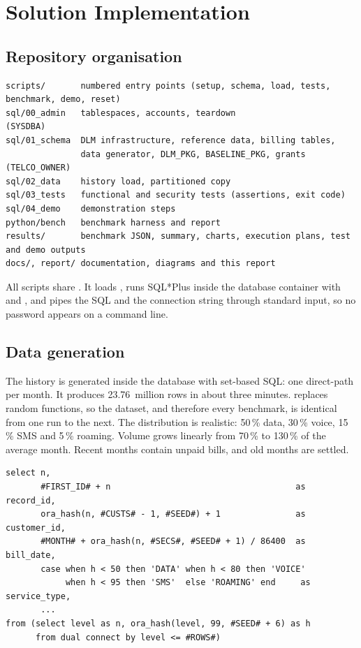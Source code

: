 \chapter{Solution Implementation}\label{ch:implementation}

\section{Repository organisation}

\begin{lstlisting}[style=console]
scripts/       numbered entry points (setup, schema, load, tests, benchmark, demo, reset)
sql/00_admin   tablespaces, accounts, teardown                       (SYSDBA)
sql/01_schema  DLM infrastructure, reference data, billing tables,
               data generator, DLM_PKG, BASELINE_PKG, grants        (TELCO_OWNER)
sql/02_data    history load, partitioned copy
sql/03_tests   functional and security tests (assertions, exit code)
sql/04_demo    demonstration steps
python/bench   benchmark harness and report
results/       benchmark JSON, summary, charts, execution plans, test and demo outputs
docs/, report/ documentation, diagrams and this report
\end{lstlisting}

All scripts share . It loads , runs SQL*Plus inside the
database container with  and , and
pipes the SQL and the connection string through standard input, so no password appears on a
command line.

\section{Data generation}

The history is generated inside the database with set-based SQL: one direct-path
 per month. It produces 23.76~million rows in about three minutes.
 replaces random functions, so the dataset, and therefore
every benchmark, is identical from one run to the next. The distribution is realistic: 50\,\%
data, 30\,\% voice, 15\,\% SMS and 5\,\% roaming. Volume grows linearly from 70\,\% to
130\,\% of the average month. Recent months contain unpaid bills, and old months are settled.

\needspace{0.3\textheight}
\begin{lstlisting}[style=sql, caption={Generator core (excerpt of \code{04\_datagen.sql})}]
select n,
       #FIRST_ID# + n                                     as record_id,
       ora_hash(n, #CUSTS# - 1, #SEED#) + 1               as customer_id,
       #MONTH# + ora_hash(n, #SECS#, #SEED# + 1) / 86400  as bill_date,
       case when h < 50 then 'DATA' when h < 80 then 'VOICE'
            when h < 95 then 'SMS'  else 'ROAMING' end     as service_type,
       ...
from (select level as n, ora_hash(level, 99, #SEED# + 6) as h
      from dual connect by level <= #ROWS#)
\end{lstlisting}

